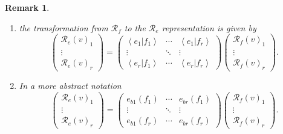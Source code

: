 \documentclass[aps,preprint]{revtex4}
\newtheorem{remark}[theorem]{Remark}
\begin{document}
\begin{remark}
\begin{enumerate}
\item the transformation from $\mathcal{R}_{f}$ to the $\mathcal{R}_{e}$
representation is given by 
\begin{equation}
\left( 
\begin{array}{c}
\mathcal{R}_{e}\left( v\right) _{1} \\ 
\vdots \\ 
\mathcal{R}_{e}\left( v\right) _{r}%
\end{array}%
\right) =\left( 
\begin{array}{ccc}
\left\langle \left. e_{1}\right\vert f_{1}\right\rangle & \cdots & 
\left\langle \left. e_{1}\right\vert f_{r}\right\rangle \\ 
\vdots & \ddots & \vdots \\ 
\left\langle \left. e_{r}\right\vert f_{1}\right\rangle & \cdots & 
\left\langle \left. e_{r}\right\vert f_{r}\right\rangle%
\end{array}%
\right) \left( 
\begin{array}{c}
\mathcal{R}_{f}\left( v\right) _{1} \\ 
\vdots \\ 
\mathcal{R}_{f}\left( v\right) _{r}%
\end{array}%
\right) .
\end{equation}

\item In a more abstract notation 
\begin{equation}
\left( 
\begin{array}{c}
\mathcal{R}_{e}\left( v\right) _{1} \\ 
\vdots \\ 
\mathcal{R}_{e}\left( v\right) _{r}%
\end{array}%
\right) =\left( 
\begin{array}{ccc}
e_{b1}\left( f_{1}\right) & \cdots & e_{br}\left( f_{1}\right) \\ 
\vdots & \ddots & \vdots \\ 
e_{b1}\left( f_{r}\right) & \cdots & e_{br}\left( f_{r}\right)%
\end{array}%
\right) \left( 
\begin{array}{c}
\mathcal{R}_{f}\left( v\right) _{1} \\ 
\vdots \\ 
\mathcal{R}_{f}\left( v\right) _{r}%
\end{array}%
\right) .
\end{equation}


\end{enumerate}
\end{remark}
\end{document}
